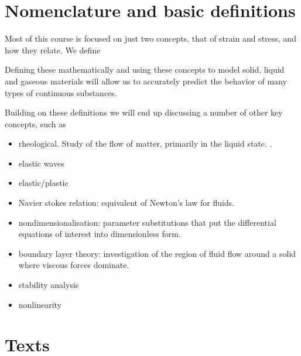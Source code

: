 \section{Nomenclature and basic definitions}

Most of this course is focused on just two concepts, that of strain and stress, and how they relate.  We define





Defining these mathematically and using these concepts to model solid, liquid and gaseous materials will allow us to accurately predict the behavior of many types of continuous substances.

Building on these definitions we will end up discussing a number of other key concepts, such as

\begin{itemize}
\item rheological.  Study of the flow of matter, primarily in the liquid state.  \citep{wiki:rheology}.
\item elastic waves
\item elastic/plastic
\item Navier stokes relation: equivalent of Newton's law for fluids.
\item nondimensionalisation: parameter substitutions that put the differential equations of interest into dimensionless form.
\item boundary layer theory: investigation of the region of fluid flow around a solid where viscous forces dominate.
\item stability analysis
\item nonlinearity 
\end{itemize}

\section{Texts}

